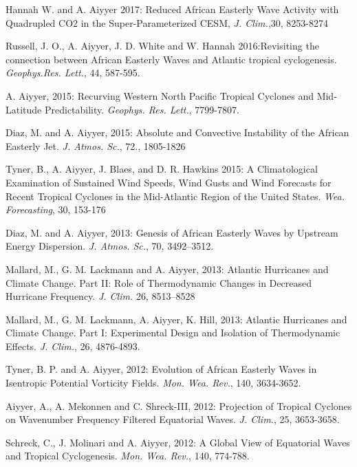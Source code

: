 \begin{ilist}
\item Hannah W. and A. Aiyyer 2017: Reduced African Easterly Wave Activity with Quadrupled
  CO2 in the Super-Parameterized CESM, \emph{J. Clim.},30, 8253-8274

\item Russell, J. O., A. Aiyyer, J. D. White and W. Hannah 2016:Revisiting the connection between African Easterly Waves and Atlantic tropical cyclogenesis.  \emph{Geophys.Res. Lett.}, 44, 587-595.

\item A. Aiyyer, 2015: Recurving Western North Pacific Tropical Cyclones and Mid-Latitude Predictability. \emph{Geophys. Res. Lett.}, 7799-7807.

\item Diaz, M. and A. Aiyyer, 2015: Absolute and Convective Instability of the African Easterly Jet. \emph{J. Atmos. Sc.}, 72., 1805-1826
  
\item Tyner, B., A. Aiyyer, J. Blaes, and D. R. Hawkins 2015: A Climatological Examination of
Sustained Wind Speeds, Wind Gusts and Wind Forecasts for Recent Tropical Cyclones in the
Mid-Atlantic Region of the United States. \emph{Wea. Forecasting}, 30, 153-176


\item Diaz, M. and A. Aiyyer, 2013: Genesis of African Easterly Waves by Upstream Energy Dispersion. \emph{J. Atmos. Sc.}, 70, 3492–3512. 

\item Mallard, M., G. M. Lackmann and A. Aiyyer, 2013: Atlantic Hurricanes and Climate Change. Part II: Role of Thermodynamic Changes in Decreased Hurricane Frequency. \emph{J. Clim.} 26, 8513–8528

\item Mallard, M., G. M. Lackmann, A. Aiyyer, K. Hill, 2013: Atlantic Hurricanes and Climate Change. Part I: Experimental Design and Isolation of Thermodynamic Effects. \emph{J. Clim.}, 26, 4876-4893.

\item Tyner, B. P. and A. Aiyyer, 2012: Evolution of African Easterly Waves in Isentropic Potential Vorticity Fields. \emph{Mon. Wea. Rev.}, 140, 3634-3652.

\item Aiyyer, A., A. Mekonnen and C. Shreck-III, 2012: Projection of Tropical Cyclones on Wavenumber Frequency Filtered Equatorial Waves. \emph{J. Clim.}, 25, 3653-3658.

\item Schreck, C., J. Molinari and A. Aiyyer, 2012: A Global View of Equatorial Waves and Tropical Cyclogenesis. \emph{Mon. Wea. Rev.}, 140, 774-788.



\end{ilist}
